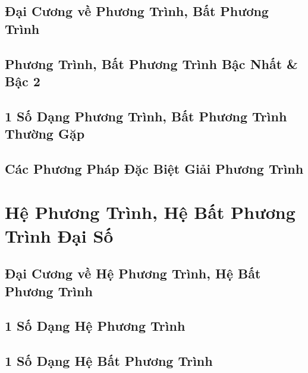 \documentclass{article}
\numberwithin{equation}{section}
\begin{document}
\subsection{Đại Cương về Phương Trình, Bất Phương Trình}


\subsection{Phương Trình, Bất Phương Trình Bậc Nhất \& Bậc 2}


\subsection{1 Số Dạng Phương Trình, Bất Phương Trình Thường Gặp}


\subsection{Các Phương Pháp Đặc Biệt Giải Phương Trình}


\section{Hệ Phương Trình, Hệ Bất Phương Trình Đại Số}

\subsection{Đại Cương về Hệ Phương Trình, Hệ Bất Phương Trình}


\subsection{1 Số Dạng Hệ Phương Trình}


\subsection{1 Số Dạng Hệ Bất Phương Trình}
\end{document}
